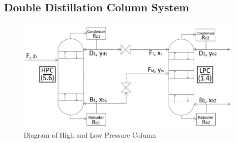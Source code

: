     \subsection{Double Distillation Column System}
    \begin{figure}[ht]
        \centering
        \includegraphics[width=0.9\linewidth]{airseparation/handouts/graphics/labelled_columns_diagram_simple.jpg}
        \caption{Diagram of High and Low Pressure Column}
        \label{fig:column_linkage}
    \end{figure}
    \hfill
    \hfill
